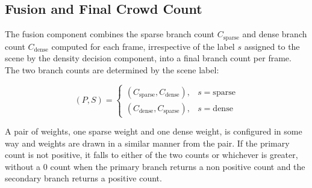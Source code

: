 
\subsection{Fusion and Final Crowd Count}
\label{sec:fusion}

The fusion component combines the sparse branch count $C_{\text{sparse}}$ and dense branch count $C_{\text{dense}}$ computed for each frame, irrespective of the label $s$ assigned to the scene by the density decision component, into a final branch count per frame. The two branch counts are determined by the scene label:

\begin{equation}
	(P,S) =
	\begin{cases}
		(C_{\text{sparse}}, C_{\text{dense}}), & s = \text{sparse} \\
		(C_{\text{dense}}, C_{\text{sparse}}), & s = \text{dense}
	\end{cases}
\end{equation}

A pair of weights, one sparse weight and one dense weight, is configured in some way and weights are drawn in a similar manner from the pair. If the primary count is not positive, it falls to either of the two counts or whichever is greater, without a 0 count when the primary branch returns a non positive count and the secondary branch returns a positive count.

